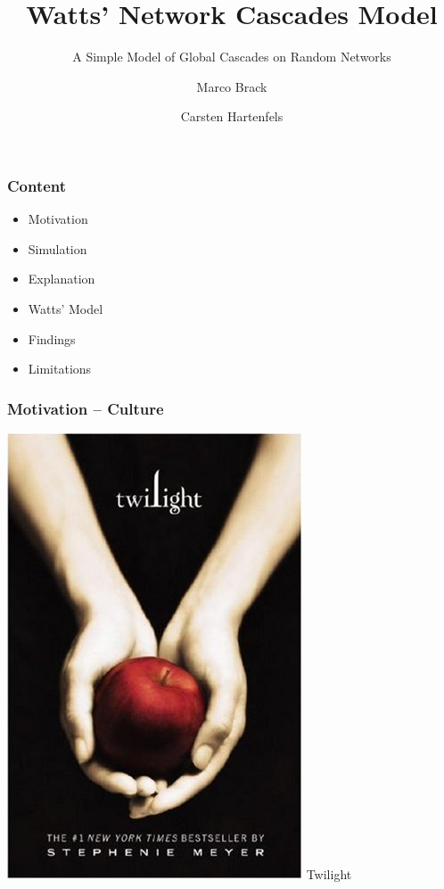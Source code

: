 \documentclass[slidestop,usenames,dvipsnames]{beamer}
\title{Watts' Network Cascades Model}
\subtitle{A Simple Model of Global Cascades on Random Networks}
\author{Marco Brack \and Carsten Hartenfels}
\newcommand{\gitem}{\vfill\item}
\begin{document}
\begin{frame}
    \titlepage
\end{frame}




\begin{frame}
    \frametitle{Content}
    \begin{itemize}
        \gitem Motivation
        \gitem Simulation
        \gitem Explanation
        \gitem Watts' Model
        \gitem Findings
        \gitem Limitations
    \end{itemize}
    \vfill
\end{frame}


\begin{frame}
    \frametitle{Motivation -- Culture}
    \begin{center}
        \includegraphics[height=0.7\textheight]{img/twilight}
        \vfill\vspace{8pt}
        {\huge Twilight}
    \end{center}
    \vfill
\end{frame}
\end{document}
